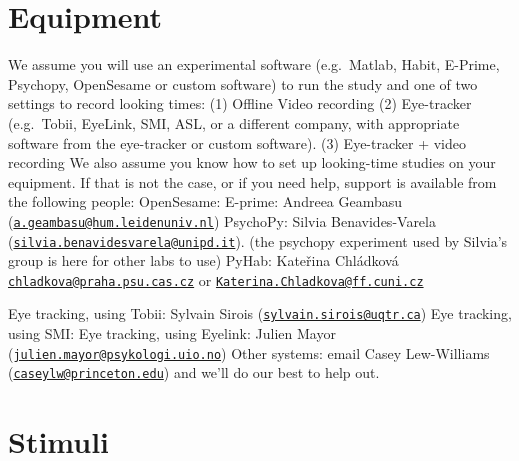 \documentclass[
]{book}
\begin{document}
\section{Equipment}\label{equipment}

We assume you will use an experimental software (e.g.~Matlab, Habit, E-Prime, Psychopy, OpenSesame or custom software) to run the study and one of two settings to record looking times:
(1) Offline Video recording
(2) Eye-tracker (e.g.~Tobii, EyeLink, SMI, ASL, or a different company, with appropriate software from the eye-tracker or custom software).
(3) Eye-tracker + video recording
We also assume you know how to set up looking-time studies on your equipment. If that is not the case, or if you need help, support is available from the following people:
OpenSesame:
E-prime: Andreea Geambasu (\href{mailto:a.geambasu@hum.leidenuniv.nl}{\nolinkurl{a.geambasu@hum.leidenuniv.nl}})
PsychoPy: Silvia Benavides-Varela (\href{mailto:silvia.benavidesvarela@unipd.it}{\nolinkurl{silvia.benavidesvarela@unipd.it}}). (the psychopy experiment used by Silvia's group is here for other labs to use)
PyHab: Kateřina Chládková \href{mailto:chladkova@praha.psu.cas.cz}{\nolinkurl{chladkova@praha.psu.cas.cz}} or \href{mailto:Katerina.Chladkova@ff.cuni.cz}{\nolinkurl{Katerina.Chladkova@ff.cuni.cz}}

Eye tracking, using Tobii: Sylvain Sirois (\href{mailto:sylvain.sirois@uqtr.ca}{\nolinkurl{sylvain.sirois@uqtr.ca}})
Eye tracking, using SMI:
Eye tracking, using Eyelink: Julien Mayor (\href{mailto:julien.mayor@psykologi.uio.no}{\nolinkurl{julien.mayor@psykologi.uio.no}})
Other systems: email Casey Lew-Williams (\href{mailto:caseylw@princeton.edu}{\nolinkurl{caseylw@princeton.edu}}) and we'll do our best to help out.

\section{Stimuli}\label{stimuli}
\end{document}
